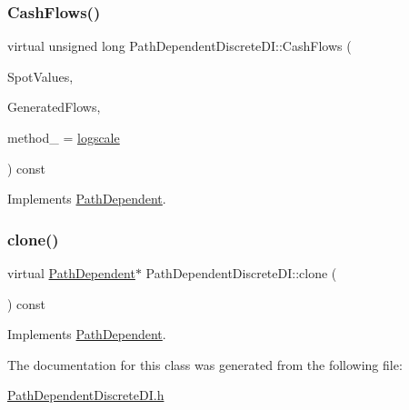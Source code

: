 \subsubsection{\texorpdfstring{Cash\+Flows()}{CashFlows()}}
{\footnotesize\ttfamily virtual unsigned long Path\+Dependent\+Discrete\+D\+I\+::\+Cash\+Flows (\begin{DoxyParamCaption}\item[{const \hyperlink{classMJArray}{M\+J\+Array} \&}]{Spot\+Values,  }\item[{std\+::vector$<$ \hyperlink{classMyCashFlow_1_1CashFlow}{My\+Cash\+Flow\+::\+Cash\+Flow} $>$ \&}]{Generated\+Flows,  }\item[{\hyperlink{PathDependent_8h_abed946c62f140eb7ff2ac742e6ad9497}{method}}]{method\+\_\+ = {\ttfamily \hyperlink{PathDependent_8h_abed946c62f140eb7ff2ac742e6ad9497a064d3d3358889658ce07fe9f3191d1fd}{logscale}} }\end{DoxyParamCaption}) const\hspace{0.3cm}{\ttfamily [virtual]}}



Implements \hyperlink{classPathDependent_a5d5b1d6ecf9dc6be128fff9694f589c8}{Path\+Dependent}.

\hypertarget{classPathDependentDiscreteDI_a9b5ac8d8a7562e75a07c31e031586a16}{}\label{classPathDependentDiscreteDI_a9b5ac8d8a7562e75a07c31e031586a16} 
\subsubsection{\texorpdfstring{clone()}{clone()}}
{\footnotesize\ttfamily virtual \hyperlink{classPathDependent}{Path\+Dependent}$\ast$ Path\+Dependent\+Discrete\+D\+I\+::clone (\begin{DoxyParamCaption}{ }\end{DoxyParamCaption}) const\hspace{0.3cm}{\ttfamily [virtual]}}



Implements \hyperlink{classPathDependent_afcc10647f591175642c6dc0adba23f0b}{Path\+Dependent}.



The documentation for this class was generated from the following file\+:\begin{DoxyCompactItemize}
\item 
\hyperlink{PathDependentDiscreteDI_8h}{Path\+Dependent\+Discrete\+D\+I.\+h}\end{DoxyCompactItemize}
